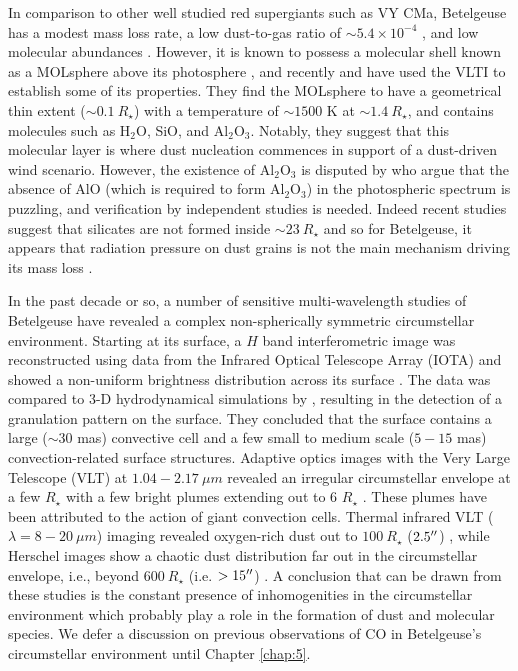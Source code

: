 In comparison to other well studied red supergiants such as VY CMa, Betelgeuse has a modest mass loss rate, a low dust-to-gas ratio of $\sim 5.4 \times 10^{-4}$ \citep{harper_2001,bowers_1987}, and low molecular abundances \citep{knapp_1980, huggins_1987, jewell_1991, lambert_1978}. However, it is known to possess a molecular shell known as a MOLsphere above its photosphere \citep{tsuji_2000}, and recently \cite{verhoelst_2006} and \cite{perrin_2007} have used the VLTI to establish some of its properties. They find the MOLsphere to have a geometrical thin extent ($\sim 0.1 \ R_{\star}$) with a temperature of $\sim 1500$ K at $\sim 1.4 \ R_{\star}$, and contains molecules such as H$_{2}$O, SiO, and Al$_{2}$O$_{3}$. Notably, they suggest that this molecular layer is where dust nucleation commences in support of a dust-driven wind scenario. However, the existence of Al$_{2}$O$_{3}$ is disputed by \cite{kaminski_2013} who argue that the absence of AlO (which is required to form Al$_{2}$O$_{3}$) in the photospheric spectrum is puzzling, and verification by independent studies is needed. Indeed recent studies suggest that silicates are not formed inside $\sim 23 \ R_{\star}$ \citep{skinner_1997,tatebe_2007} and so for Betelgeuse, it appears that radiation pressure on dust grains is not the main mechanism driving its mass loss \citep{harper_2010}.

In the past decade or so, a number of sensitive multi-wavelength studies of Betelgeuse have revealed a complex non-spherically symmetric circumstellar environment. Starting at its surface, a $H$ band interferometric image was reconstructed using data from the Infrared Optical Telescope Array (IOTA) and showed a non-uniform brightness distribution across its surface \citep{haubois_2009}. The data was compared to 3-D hydrodynamical simulations by \cite{chiavassa_2010}, resulting in the detection of a granulation pattern on the surface. They concluded that  the surface contains a large ($\sim 30$ mas) convective cell and a few small to medium scale ($5-15$ mas) convection-related surface structures. Adaptive optics images with the Very Large Telescope (VLT) at $1.04 -2.17 \ \mu m$ revealed an irregular circumstellar envelope at a few $R_{\star}$ with a few bright plumes extending out to 6 $R_{\star}$ \citep{kervella_2009}. These plumes have been attributed to the action of giant convection cells. Thermal infrared VLT ($\lambda=8-20 \ \mu m$) imaging revealed oxygen-rich dust out to $100 \ R_{\star}$ ($2.5^{\prime\prime}$) \citep{kervella_2011}, while Herschel images show a chaotic dust distribution far out in the circumstellar envelope, i.e., beyond $600 \ R_{\star}$ (i.e. $> 15^{\prime\prime}$) \citep{decin_2012}. A conclusion that can be drawn from these studies is the constant presence of inhomogenities in the circumstellar environment which probably play a role in the formation of dust and molecular species. We defer a discussion on previous observations of CO in Betelgeuse's circumstellar environment until Chapter \ref{chap:5}.

